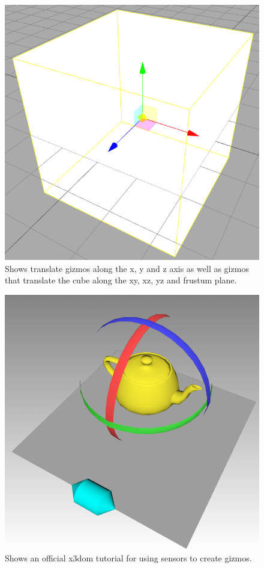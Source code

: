 \begin{figure}[]
  \centering
  \includegraphics[width=12cm]{../assets/threejs-editor.png}
	\caption{ Shows translate gizmos along the x, y and z axis as well as gizmos that translate the cube along the xy, xz, yz and frustum plane. \cite{threejseditor} }
\end{figure}
\begin{figure}[]
  \centering
  \includegraphics[width=12cm]{../assets/x3dom-gizmo-example.png}
	\caption{ Shows an official x3dom tutorial for using sensors to create gizmos. \cite{x3dgizmo} }
	\label{fig:x3dgizmo}
\end{figure}


